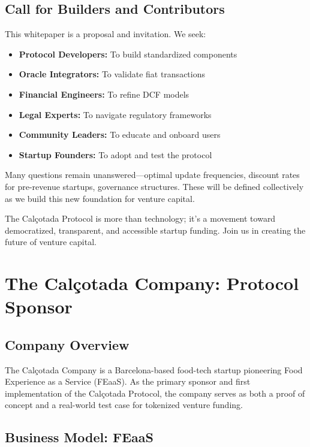 \documentclass[conference]{IEEEtran}
\begin{document}
\subsection{Call for Builders and Contributors}

This whitepaper is a proposal and invitation. We seek:
\begin{itemize}
    \item \textbf{Protocol Developers:} To build standardized components
    \item \textbf{Oracle Integrators:} To validate fiat transactions
    \item \textbf{Financial Engineers:} To refine DCF models
    \item \textbf{Legal Experts:} To navigate regulatory frameworks
    \item \textbf{Community Leaders:} To educate and onboard users
    \item \textbf{Startup Founders:} To adopt and test the protocol
\end{itemize}

Many questions remain unanswered—optimal update frequencies, discount rates for pre-revenue startups, governance structures. These will be defined collectively as we build this new foundation for venture capital.

The Calçotada Protocol is more than technology; it's a movement toward democratized, transparent, and accessible startup funding. Join us in creating the future of venture capital.

\section{The Calçotada Company: Protocol Sponsor}

\subsection{Company Overview}

The Calçotada Company is a Barcelona-based food-tech startup pioneering Food Experience as a Service (FEaaS). As the primary sponsor and first implementation of the Calçotada Protocol, the company serves as both a proof of concept and a real-world test case for tokenized venture funding.

\subsection{Business Model: FEaaS}
\end{document}
